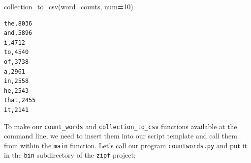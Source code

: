 \documentclass[
]{krantz}
\makeatletter
\newenvironment{Shaded}{\begin{snugshade}}{\end{snugshade}}
\newcommand{\DecValTok}[1]{\textcolor[rgb]{0.00,0.00,0.81}{#1}}
\newcommand{\NormalTok}[1]{#1}
\newcommand{\OperatorTok}[1]{\textcolor[rgb]{0.81,0.36,0.00}{\textbf{#1}}}
\newenvironment{kframe}{%
\medskip{}
\setlength{\fboxsep}{.8em}
 \def\at@end@of@kframe{}%
 \ifinner\ifhmode%
  \def\at@end@of@kframe{\end{minipage}}%
  \begin{minipage}{\columnwidth}%
 \fi\fi%
 \def\FrameCommand##1{\hskip\@totalleftmargin \hskip-\fboxsep
 \colorbox{shadecolor}{##1}\hskip-\fboxsep
     \hskip-\linewidth \hskip-\@totalleftmargin \hskip\columnwidth}%
 \MakeFramed {\advance\hsize-\width
   \@totalleftmargin\z@ \linewidth\hsize
   \@setminipage}}%
 {\par\unskip\endMakeFramed%
 \at@end@of@kframe}
\renewenvironment{Shaded}{\begin{kframe}}{\end{kframe}}
\makeatother
\begin{document}
\begin{Shaded}
\begin{Highlighting}[]
\NormalTok{collection\_to\_csv(word\_counts, num}\OperatorTok{=}\DecValTok{10}\NormalTok{)}
\end{Highlighting}
\end{Shaded}

\begin{verbatim}
the,8036
and,5896
i,4712
to,4540
of,3738
a,2961
in,2558
he,2543
that,2455
it,2141
\end{verbatim}

To make our \texttt{count\_words} and \texttt{collection\_to\_csv} functions available at the command line,
we need to insert them into our script template
and call them from within the \texttt{main} function.
Let's call our program \texttt{countwords.py}
and put it in the \texttt{bin} subdirectory of the \texttt{zipf} project:
\end{document}
